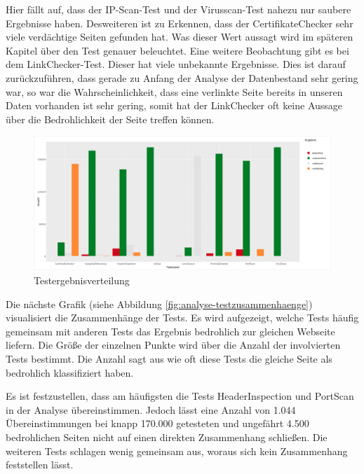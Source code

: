 Hier fällt auf, dass der IP-Scan-Test und der Virusscan-Test nahezu nur saubere Ergebnisse haben. Desweiteren ist zu Erkennen, dass der CertifikateChecker sehr viele verdächtige Seiten gefunden hat. Was dieser Wert aussagt wird im späteren Kapitel über den Test genauer beleuchtet. Eine weitere Beobachtung gibt es bei dem LinkChecker-Test. Dieser hat viele unbekannte Ergebnisse. Dies ist darauf zurückzuführen, dass gerade zu Anfang der Analyse der Datenbestand sehr gering war, so war die Wahrscheinlichkeit, dass eine verlinkte Seite bereits in unseren Daten vorhanden ist sehr gering, somit hat der LinkChecker oft keine Aussage über die Bedrohlichkeit der Seite treffen können.
\begin{figure}[H]
  \centering
  \includegraphics[width=15cm]{images/stats/ergebnisverteilung}
  \caption{Testergebnisverteilung\protect\footnotemark}
  \label{fig:analyse-ergebnisverteilung}
\end{figure}

Die nächste Grafik (siehe Abbildung \ref{fig:analyse-testzusammenhaenge}) visualisiert die Zusammenhänge der Tests. Es wird aufgezeigt, welche Tests häufig gemeinsam mit anderen Tests das Ergebnis bedrohlich zur gleichen Webseite liefern. Die Größe der einzelnen Punkte wird über die Anzahl der involvierten Tests bestimmt. Die Anzahl sagt aus wie oft diese Tests die gleiche Seite als bedrohlich klassifiziert haben.

Es ist festzustellen, dass am häufigsten die Tests HeaderInspection und PortScan in der Analyse übereinstimmen. Jedoch lässt eine Anzahl von 1.044 Übereinstimmungen bei knapp 170.000 getesteten und ungefährt 4.500 bedrohlichen Seiten nicht auf einen direkten Zusammenhang schließen. Die weiteren Tests schlagen wenig gemeinsam aus, woraus sich kein Zusammenhang feststellen lässt.

